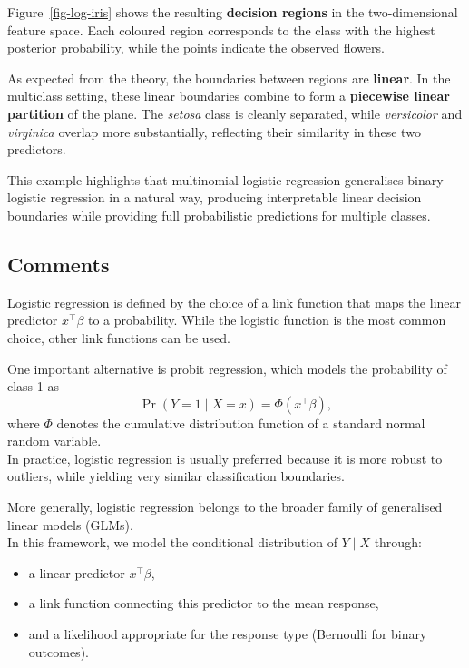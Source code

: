 \documentclass[
  letterpaper,
  DIV=11,
  numbers=noendperiod]{scrartcl}
\providecommand{\tightlist}{%
  \setlength{\itemsep}{0pt}\setlength{\parskip}{0pt}}\usepackage{longtable,booktabs,array}
\begin{document}
Figure~\ref{fig-log-iris} shows the resulting \textbf{decision regions}
in the two-dimensional feature space. Each coloured region corresponds
to the class with the highest posterior probability, while the points
indicate the observed flowers.

As expected from the theory, the boundaries between regions are
\textbf{linear}. In the multiclass setting, these linear boundaries
combine to form a \textbf{piecewise linear partition} of the plane. The
\emph{setosa} class is cleanly separated, while \emph{versicolor} and
\emph{virginica} overlap more substantially, reflecting their similarity
in these two predictors.

This example highlights that multinomial logistic regression generalises
binary logistic regression in a natural way, producing interpretable
linear decision boundaries while providing full probabilistic
predictions for multiple classes.

\subsection{Comments}\label{comments-1}

Logistic regression is defined by the choice of a link function that
maps the linear predictor \(x^\top \beta\) to a probability. While the
logistic function is the most common choice, other link functions can be
used.

One important alternative is probit regression, which models the
probability of class 1 as
\[\Pr(Y = 1 \mid X = x) = \Phi(x^\top \beta),\] where \(\Phi\) denotes
the cumulative distribution function of a standard normal random
variable.\\
In practice, logistic regression is usually preferred because it is more
robust to outliers, while yielding very similar classification
boundaries.

More generally, logistic regression belongs to the broader family of
generalised linear models (GLMs).\\
In this framework, we model the conditional distribution of \(Y \mid X\)
through:

\begin{itemize}
\tightlist
\item
  a linear predictor \(x^\top \beta\),
\item
  a link function connecting this predictor to the mean response,
\item
  and a likelihood appropriate for the response type (Bernoulli for
  binary outcomes).
\end{itemize}
\end{document}
